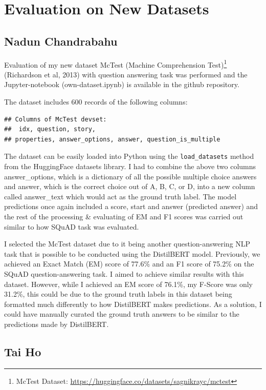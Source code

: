 \documentclass[
  11pt,
]{article}
\begin{document}
\section{Evaluation on New Datasets}\label{evaluation-on-new-datasets}

\subsection{Nadun Chandrabahu}\label{nadun-chandrabahu}

Evaluation of my new dataset McTest (Machine Comprehension
Test)\footnote{McTest Dataset:
  \url{https://huggingface.co/datasets/sagnikrayc/mctest}} (Richardson
et al, 2013) with question answering task was performed and the
Jupyter-notebook (own-dataset.ipynb) is available in the github
repository.

The dataset includes 600 records of the following columns:

\begin{verbatim}
## Columns of McTest devset:
##  idx, question, story,
## properties, answer_options, answer, question_is_multiple
\end{verbatim}

The dataset can be easily loaded into Python using the
\texttt{load\_datasets} method from the HuggingFace datasets library. I
had to combine the above two columns answer\_options, which is a
dictionary of all the possible multiple choice answers and answer, which
is the correct choice out of A, B, C, or D, into a new column called
answer\_text which would act as the ground truth label. The model
predictions once again included a score, start and answer (predicted
answer) and the rest of the processing \& evaluating of EM and F1 scores
was carried out similar to how SQuAD task was evaluated.

I selected the McTest dataset due to it being another question-answering
NLP task that is possible to be conducted using the DistilBERT model.
Previously, we achieved an Exact Match (EM) score of 77.6\% and an F1
score of 75.2\% on the SQuAD question-answering task. I aimed to achieve
similar results with this dataset. However, while I achieved an EM score
of 76.1\%, my F-Score was only 31.2\%, this could be due to the ground
truth labels in this dataset being formatted much differently to how
DistilBERT makes predictions. As a solution, I could have manually
curated the ground truth answers to be similar to the predictions made
by DistilBERT.

\subsection{Tai Ho}\label{tai-ho}
\end{document}
